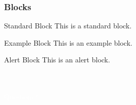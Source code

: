 \documentclass[compress,11 pt,t]{beamer}
\begin{document}
\begin{frame}
\frametitle{Blocks}

\begin{block}{Standard Block}
    This is a standard block.
\end{block}

\begin{exampleblock}{Example Block}
    This is an example block.
\end{exampleblock}

\begin{alertblock}{Alert Block}
    This is an alert block.
\end{alertblock}



\end{frame}


\begin{frame}
\ \\ \ \\
\centering \Large \textcolor{white}{Questions?}

\end{frame}
\usebackgroundtemplate{}
\end{document}
